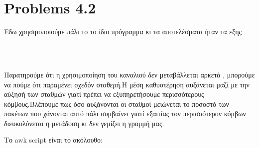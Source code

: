 \documentclass{article}
\begin{document}
\section*{Problems 4.2}
Εδω χρησιμοποιούμε πάλι το το ίδιο πρόγραμμα κι τα αποτελέσματα ήταν τα εξης
\begin{figure}[ht!]
	\centering
	\qquad \\
\end{figure}\\

Παρατηρούμε ότι η χρησιμοποίηση του καναλιού δεν μεταβάλλεται αρκετά , μπορούμε να πούμε ότι παραμένει σχεδόν σταθερή.Η μέση καθυστέρηση αυξάνεται μαζί με την αύξησή των σταθμών γιατί πρέπει να εξυπηρετήσουμε περισσότερους κόμβους.Βλέπουμε πως όσο αυξάνονται οι σταθμοί μειώνεται το ποσοστό των πακέτων που χάνονται αυτό πάλι συμβαίνει γιατί εξαιτίας τον περισσότερον κόμβων διευκολύνεται η μετάδοση κι δεν γεμίζει η γραμμή μας.

Το awk script είναι το ακόλουθο:
	
\end{document}
